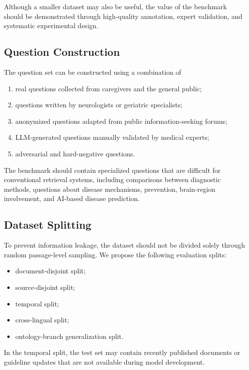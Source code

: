 \documentclass{article}
\begin{document}
Although a smaller dataset may also be useful, the value of the benchmark 
should be demonstrated through high-quality annotation, expert validation, 
and systematic experimental design.

\subsection{Question Construction}

The question set can be constructed using a combination of

\begin{enumerate}
    \item real questions collected from caregivers and the general public;
    \item questions written by neurologists or geriatric specialists;
    \item anonymized questions adapted from public information-seeking forums;
    \item LLM-generated questions manually validated by medical experts;
    \item adversarial and hard-negative questions.
\end{enumerate}

The benchmark should contain specialized questions that are difficult for 
conventional retrieval systems, including comparisons between diagnostic 
methods, questions about disease mechanisms, prevention, brain-region 
involvement, and AI-based disease prediction.

\subsection{Dataset Splitting}

To prevent information leakage, the dataset should not be divided solely 
through random passage-level sampling. We propose the following evaluation 
splits:

\begin{itemize}
    \item document-disjoint split;
    \item source-disjoint split;
    \item temporal split;
    \item cross-lingual split;
    \item ontology-branch generalization split.
\end{itemize}

In the temporal split, the test set may contain recently published documents 
or guideline updates that are not available during model development.
\end{document}
